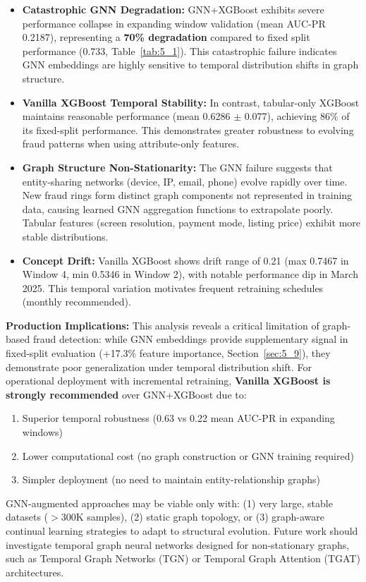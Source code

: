 \begin{itemize}
    \item \textbf{Catastrophic GNN Degradation:} GNN+XGBoost exhibits severe performance collapse in expanding window validation (mean AUC-PR 0.2187), representing a \textbf{70\% degradation} compared to fixed split performance (0.733, Table~\ref{tab:5_1}). This catastrophic failure indicates GNN embeddings are highly sensitive to temporal distribution shifts in graph structure.

    \item \textbf{Vanilla XGBoost Temporal Stability:} In contrast, tabular-only XGBoost maintains reasonable performance (mean 0.6286 $\pm$ 0.077), achieving 86\% of its fixed-split performance. This demonstrates greater robustness to evolving fraud patterns when using attribute-only features.

    \item \textbf{Graph Structure Non-Stationarity:} The GNN failure suggests that entity-sharing networks (device, IP, email, phone) evolve rapidly over time. New fraud rings form distinct graph components not represented in training data, causing learned GNN aggregation functions to extrapolate poorly. Tabular features (screen resolution, payment mode, listing price) exhibit more stable distributions.

    \item \textbf{Concept Drift:} Vanilla XGBoost shows drift range of 0.21 (max 0.7467 in Window 4, min 0.5346 in Window 2), with notable performance dip in March 2025. This temporal variation motivates frequent retraining schedules (monthly recommended).
\end{itemize}

\textbf{Production Implications:} This analysis reveals a critical limitation of graph-based fraud detection: while GNN embeddings provide supplementary signal in fixed-split evaluation (+17.3\% feature importance, Section~\ref{sec:5_9}), they demonstrate poor generalization under temporal distribution shift. For operational deployment with incremental retraining, \textbf{Vanilla XGBoost is strongly recommended} over GNN+XGBoost due to:
\begin{enumerate}
    \item Superior temporal robustness (0.63 vs 0.22 mean AUC-PR in expanding windows)
    \item Lower computational cost (no graph construction or GNN training required)
    \item Simpler deployment (no need to maintain entity-relationship graphs)
\end{enumerate}

GNN-augmented approaches may be viable only with: (1) very large, stable datasets ($>$300K samples), (2) static graph topology, or (3) graph-aware continual learning strategies to adapt to structural evolution. Future work should investigate temporal graph neural networks designed for non-stationary graphs, such as Temporal Graph Networks (TGN) or Temporal Graph Attention (TGAT) architectures.

